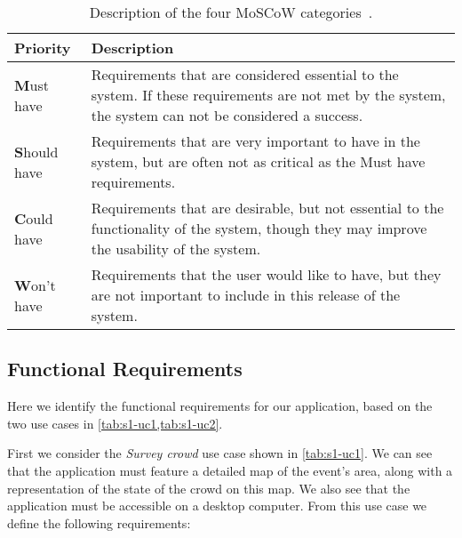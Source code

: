 \begin{table}[h!]
	\centering
	\begin{tabularx}{\textwidth}{lX}
		\toprule
		\textbf{Priority} & \textbf{Description} \\
		\midrule
		\textbf{M}ust have & Requirements that are considered essential to the system. If these requirements are not met by the system, the system can not be considered a success. \\
		\hline
		\textbf{S}hould have & Requirements that are very important to have in the system, but are often not as critical as the Must have requirements. \\
		\hline
		\textbf{C}ould have & Requirements that are desirable, but not essential to the functionality of the system, though they may improve the usability of the system. \\
		\hline
		\textbf{W}on't have & Requirements that the user would like to have, but they are not important to include in this release of the system. \\
		\bottomrule
	\end{tabularx}
	\caption{Description of the four MoSCoW categories~\cite{moscow}.}
	\label{tab:moscow}
\end{table}

\subsection{Functional Requirements} \label{ss:s1_freqs}
Here we identify the functional requirements for our application, based on the two use cases in \cref{tab:s1-uc1,tab:s1-uc2}. 

First we consider the \emph{Survey crowd} use case shown in \cref{tab:s1-uc1}. We can see that the application must feature a detailed map of the event's area, along with a representation of the state of the crowd on this map. We also see that the application must be accessible on a desktop computer. From this use case we define the following requirements:

